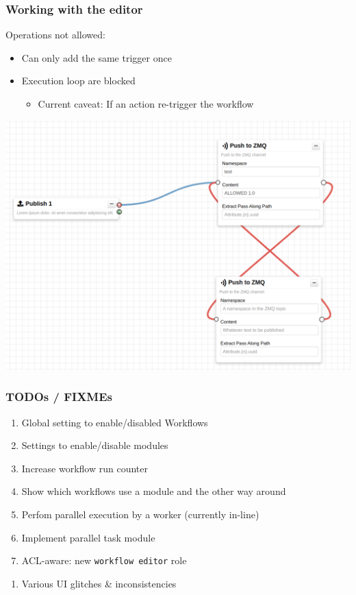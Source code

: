\begin{frame}
    \frametitle{Working with the editor}
    Operations not allowed:
    \begin{itemize}
        \item Can only add the same trigger once
        \item Execution loop are blocked
        \begin{itemize}
            \item Current caveat: If an action re-trigger the workflow
        \end{itemize}
    \end{itemize}
    \begin{center}
        \includegraphics[width=0.7\linewidth]{pictures/editor-not-allowed-1.png}
    \end{center}
\end{frame}

\begin{frame}
    \frametitle{TODOs / FIXMEs}
    \begin{enumerate}
        \item Global setting to enable/disabled Workflows
        \item Settings to enable/disable modules
        \item Increase workflow run counter
        \item Show which workflows use a module and the other way around
        \item Perfom parallel execution by a worker (currently in-line)
        \item Implement parallel task module
        \item ACL-aware: new \texttt{workflow editor} role
    \end{enumerate}
    \begin{enumerate}
        \item Various UI glitches \& inconsistencies
    \end{enumerate}
\end{frame}

